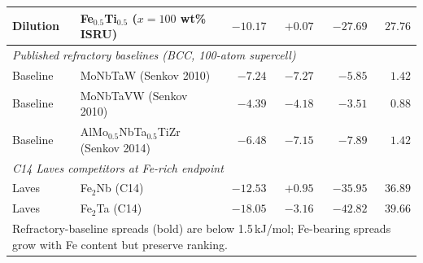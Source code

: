 \documentclass[11pt,a4paper]{article}
\begin{document}
\begin{landscape}
\begin{table}[p]
\begin{tabular}{llrrrr}
Dilution & Fe$_{0.5}$Ti$_{0.5}$ \hfill ($x = 100$ wt\% ISRU) & $-10.17$ & $+0.07$  & $-27.69$ & $27.76$ \\
\midrule
\multicolumn{6}{l}{\textit{Published refractory baselines (BCC, 100-atom supercell)}} \\
Baseline & MoNbTaW \hfill (Senkov 2010)                 &  $-7.24$ & $-7.27$  & $-5.85$  & $\mathbf{1.42}$ \\
Baseline & MoNbTaVW \hfill (Senkov 2010)                &  $-4.39$ & $-4.18$  & $-3.51$  & $\mathbf{0.88}$ \\
Baseline & AlMo$_{0.5}$NbTa$_{0.5}$TiZr \hfill (Senkov 2014) &  $-6.48$ & $-7.15$  & $-7.89$  & $\mathbf{1.42}$ \\
\midrule
\multicolumn{6}{l}{\textit{C14 Laves competitors at Fe-rich endpoint}} \\
Laves    & Fe$_2$Nb (C14)                                & $-12.53$ & $+0.95$  & $-35.95$ & $36.89$ \\
Laves    & Fe$_2$Ta (C14)                                & $-18.05$ & $-3.16$  & $-42.82$ & $39.66$ \\
\bottomrule
\multicolumn{6}{l}{\scriptsize Refractory-baseline spreads (bold) are below 1.5\,kJ/mol; Fe-bearing spreads grow with Fe content but preserve ranking.}
\end{tabular}
\end{table}
\end{landscape}
\end{document}
